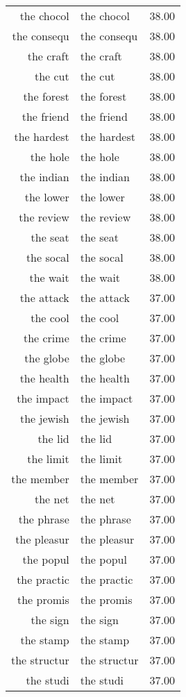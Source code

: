 \begin{table}[ht]
\begin{tabular}{rlr}
  the chocol & the chocol & 38.00 \\ 
  the consequ & the consequ & 38.00 \\ 
  the craft & the craft & 38.00 \\ 
  the cut & the cut & 38.00 \\ 
  the forest & the forest & 38.00 \\ 
  the friend & the friend & 38.00 \\ 
  the hardest & the hardest & 38.00 \\ 
  the hole & the hole & 38.00 \\ 
  the indian & the indian & 38.00 \\ 
  the lower & the lower & 38.00 \\ 
  the review & the review & 38.00 \\ 
  the seat & the seat & 38.00 \\ 
  the socal & the socal & 38.00 \\ 
  the wait & the wait & 38.00 \\ 
  the attack & the attack & 37.00 \\ 
  the cool & the cool & 37.00 \\ 
  the crime & the crime & 37.00 \\ 
  the globe & the globe & 37.00 \\ 
  the health & the health & 37.00 \\ 
  the impact & the impact & 37.00 \\ 
  the jewish & the jewish & 37.00 \\ 
  the lid & the lid & 37.00 \\ 
  the limit & the limit & 37.00 \\ 
  the member & the member & 37.00 \\ 
  the net & the net & 37.00 \\ 
  the phrase & the phrase & 37.00 \\ 
  the pleasur & the pleasur & 37.00 \\ 
  the popul & the popul & 37.00 \\ 
  the practic & the practic & 37.00 \\ 
  the promis & the promis & 37.00 \\ 
  the sign & the sign & 37.00 \\ 
  the stamp & the stamp & 37.00 \\ 
  the structur & the structur & 37.00 \\ 
  the studi & the studi & 37.00 \\ 

\end{tabular}
\end{table}
